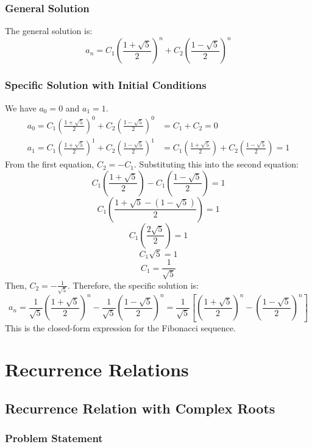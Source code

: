 \documentclass{report}
\begin{document}
\subsection{General Solution}

The general solution is:
$$a_n = C_1\left(\frac{1 + \sqrt{5}}{2}\right)^n + C_2\left(\frac{1 - \sqrt{5}}{2}\right)^n$$

\subsection{Specific Solution with Initial Conditions}

We have $a_0 = 0$ and $a_1 = 1$.
\begin{align*}
	a_0 = C_1\left(\frac{1 + \sqrt{5}}{2}\right)^0 + C_2\left(\frac{1 - \sqrt{5}}{2}\right)^0 & = C_1 + C_2 = 0                                                                       \\
	a_1 = C_1\left(\frac{1 + \sqrt{5}}{2}\right)^1 + C_2\left(\frac{1 - \sqrt{5}}{2}\right)^1 & = C_1\left(\frac{1 + \sqrt{5}}{2}\right) + C_2\left(\frac{1 - \sqrt{5}}{2}\right) = 1
\end{align*}
From the first equation, $C_2 = -C_1$. Substituting this into the second equation:
$$C_1\left(\frac{1 + \sqrt{5}}{2}\right) - C_1\left(\frac{1 - \sqrt{5}}{2}\right) = 1$$
$$C_1\left(\frac{1 + \sqrt{5} - (1 - \sqrt{5})}{2}\right) = 1$$
$$C_1\left(\frac{2\sqrt{5}}{2}\right) = 1$$
$$C_1\sqrt{5} = 1$$
$$C_1 = \frac{1}{\sqrt{5}}$$
Then, $C_2 = -\frac{1}{\sqrt{5}}$.
Therefore, the specific solution is:
$$a_n = \frac{1}{\sqrt{5}}\left(\frac{1 + \sqrt{5}}{2}\right)^n - \frac{1}{\sqrt{5}}\left(\frac{1 - \sqrt{5}}{2}\right)^n = \frac{1}{\sqrt{5}}\left[\left(\frac{1 + \sqrt{5}}{2}\right)^n - \left(\frac{1 - \sqrt{5}}{2}\right)^n\right]$$
This is the closed-form expression for the Fibonacci sequence.

\chapter{Recurrence Relations}

\section{Recurrence Relation with Complex Roots}

\subsection{Problem Statement}
\end{document}
